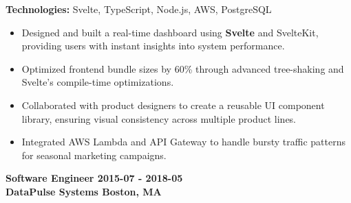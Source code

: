 \documentclass[11pt,letterpaper]{article}
\begin{document}
    \color{textcolor}
    \vspace{2pt}
    
        {\footnotesize\color{accentcolor}\textbf{Technologies:} Svelte, TypeScript, Node.js, AWS, PostgreSQL } \\
    
    
    
        \begin{itemize}[label=\textbullet]
        
            \item
            
                Designed and built a real-time dashboard using \textbf{Svelte} and SvelteKit, providing users with instant insights into system performance.
            
            
            
        
            \item
            
                Optimized frontend bundle sizes by 60\% through advanced tree-shaking and Svelte's compile-time optimizations.
            
            
            
        
            \item
            
                Collaborated with product designers to create a reusable UI component library, ensuring visual consistency across multiple product lines.
            
            
            
        
            \item
            
                Integrated AWS Lambda and API Gateway to handle bursty traffic patterns for seasonal marketing campaigns.
            
            
            
        
        \end{itemize}
    
    \vspace{6pt}

    \color{sectioncolor}
    \textbf{
        Software Engineer
        \hfill
        2015-07 - 2018-05 \\
        DataPulse Systems
        \hfill
        Boston, MA \\
    }

    \color{textcolor}
    \vspace{2pt}
    
\end{document}
